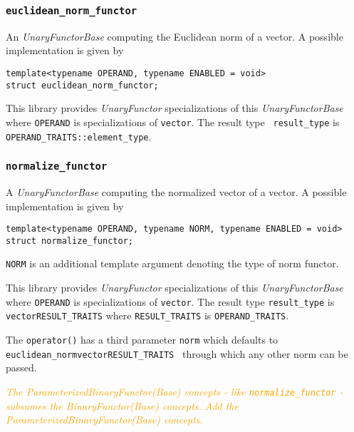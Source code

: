 \documentclass[oneside]{book}
\begin{document}
\subsubsection{\texttt{euclidean\_norm\_functor}}
An \textit{UnaryFunctorBase} computing the Euclidean norm of a vector.
A possible implementation is given by
\begin{verbatim}
template<typename OPERAND, typename ENABLED = void>
struct euclidean_norm_functor;
\end{verbatim}

This library provides \textit{UnaryFunctor} specializations of this \textit{UnaryFunctorBase}
where \texttt{OPERAND} is specializations of \texttt{vector}. The result type        \texttt{
result\_type} is \texttt{OPERAND\_TRAITS::element\_type}.

\subsubsection{\texttt{normalize\_functor}}
A \textit{UnaryFunctorBase} computing the normalized vector of a vector.
A possible implementation is given by
\begin{verbatim}
template<typename OPERAND, typename NORM, typename ENABLED = void>
struct normalize_functor;
\end{verbatim}
\texttt{NORM} is an additional template argument denoting the type of norm functor.\newline

This library provides \textit{UnaryFunctor} specializations of this \textit{UnaryFunctorBase} where
\texttt{OPERAND} is specializations of \texttt{vector}. The result type \texttt{result\_type}    is
\texttt{vector\textlangle RESULT\_TRAITS\textrangle} where \texttt{RESULT\_TRAITS}               is
\texttt{OPERAND\_TRAITS}.\newline

The \texttt{operator()} has a third parameter  \texttt{norm} which defaults to
\texttt{euclidean\_norm\textlangle vector\textlangle RESULT\_TRAITS\textrangle
\textrangle} through which any other norm can be passed.\newline

\textit{\textcolor{orange}{The \textit{ParameterizedBinaryFunctor(Base)} concepts - like
\texttt{normalize\_functor}       - subsumes the \textit{BinaryFunctor(Base)}  concepts.
Add the \textit{ParameterizedBinaryFunctor(Base) concepts.}}}
\end{document}
